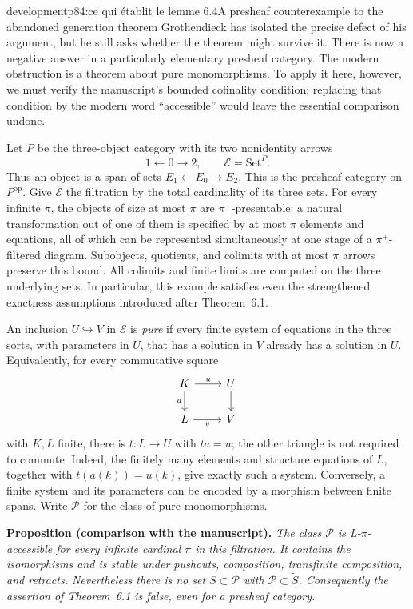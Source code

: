 \begin{dcomment}{development}{p84:ce qui établit le lemme 6.4}{A presheaf counterexample to the abandoned generation theorem}
Grothendieck has isolated the precise defect of his argument, but he still asks whether the theorem might survive it. There is now a negative answer in a particularly elementary presheaf category. The modern obstruction is a theorem about pure monomorphisms. To apply it here, however, we must verify the manuscript's bounded cofinality condition; replacing that condition by the modern word ``accessible'' would leave the essential comparison undone.

Let $P$ be the three-object category with its two nonidentity arrows
\[
1\longleftarrow 0\longrightarrow 2,
\qquad \mathcal E=\mathrm{Set}^{P}.
\]
Thus an object is a span of sets $E_1\leftarrow E_0\to E_2$. This is the presheaf category on $P^{\mathrm{op}}$. Give $\mathcal E$ the filtration by the total cardinality of its three sets. For every infinite $\pi$, the objects of size at most $\pi$ are $\pi^+$-presentable: a natural transformation out of one of them is specified by at most $\pi$ elements and equations, all of which can be represented simultaneously at one stage of a $\pi^+$-filtered diagram. Subobjects, quotients, and colimits with at most $\pi$ arrows preserve this bound. All colimits and finite limits are computed on the three underlying sets. In particular, this example satisfies even the strengthened exactness assumptions introduced after Theorem~6.1.

An inclusion $U\hookrightarrow V$ in $\mathcal E$ is \emph{pure} if every finite system of equations in the three sorts, with parameters in $U$, that has a solution in $V$ already has a solution in $U$. Equivalently, for every commutative square
\[
\begin{tikzcd}
K\arrow[r,"u"]\arrow[d,"a"']&U\arrow[d]\\
L\arrow[r,"v"']&V
\end{tikzcd}
\]
with $K,L$ finite, there is $t:L\to U$ with $ta=u$; the other triangle is not required to commute. Indeed, the finitely many elements and structure equations of $L$, together with $t(a(k))=u(k)$, give exactly such a system. Conversely, a finite system and its parameters can be encoded by a morphism between finite spans. Write $\mathcal P$ for the class of pure monomorphisms.

\textbf{Proposition (comparison with the manuscript).}\ours
\emph{The class $\mathcal P$ is L-$\pi$-accessible for every infinite cardinal $\pi$ in this filtration. It contains the isomorphisms and is stable under pushouts, composition, transfinite composition, and retracts. Nevertheless there is no set $S\subset\mathcal P$ with $\mathcal P\subset\widetilde S$. Consequently the assertion of Theorem~6.1 is false, even for a presheaf category.}


\end{dcomment}
